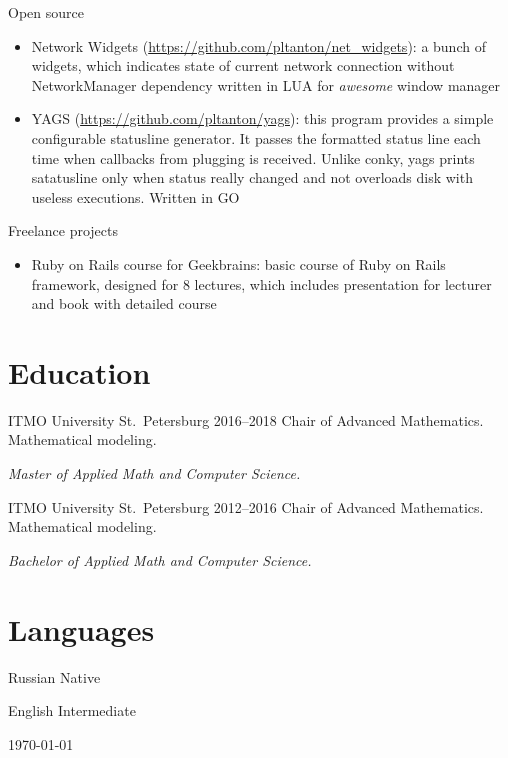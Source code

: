 \documentclass{cv}
\begin{document}
\vspace{2em}

\begin{cvblock}{Open source}
  \begin{itemize}
    \item Network Widgets
      (\url{https://github.com/pltanton/net_widgets}):
			a bunch of widgets, which indicates state of current network connection
      without NetworkManager dependency written in LUA for
      \textit{awesome} window manager
    \item YAGS
      (\url{https://github.com/pltanton/yags}):
      this program provides a simple configurable statusline generator. It
      passes the formatted status line each time when callbacks from plugging
      is received. Unlike conky, yags prints satatusline only when status
      really changed and not overloads disk with useless executions. Written in 
      GO

  \end{itemize}
\end{cvblock}

\vspace{2em}

\begin{cvblock}{Freelance projects}
  \begin{itemize}
    \item Ruby on Rails course for Geekbrains:
      basic course of Ruby on Rails framework, designed for 8 lectures, which
      includes presentation for lecturer and book with detailed course
  \end{itemize}
\end{cvblock}

\section{Education}

\begin{cvblock}{%
  \blocktitle
    {ITMO University}
    {St.~Petersburg}
    {}
    {2016--2018}}
  Chair of Advanced Mathematics. Mathematical modeling.
  \vspace{1em}

  \textit{Master of Applied Math and Computer Science.}
\end{cvblock}

\begin{cvblock}{%
  \blocktitle
    {ITMO University}
    {St.~Petersburg}
    {}
    {2012--2016}}
  Chair of Advanced Mathematics. Mathematical modeling.
  \vspace{1em}

  \textit{Bachelor of Applied Math and Computer Science.}
\end{cvblock}

\section{Languages}

\begin{cvblock}{Russian}
  Native
\end{cvblock}

\begin{cvblock}{English}
  Intermediate
\end{cvblock}

\vfill
\begin{center}
  \monthyear\today
\end{center}
\end{document}
